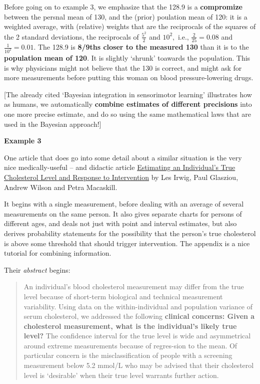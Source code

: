 \documentclass[]{book}
\begin{document}
Before going on to example 3, we emphasize that the 128.9 is a \textbf{compromize} between the persnal mean of 130, and the (prior) poulation mean of 120: it is a weighted average, with (relative) weights that are the reciprocals of the squares of the 2 standard deviations, the reciprocals of \(\frac{5^2}{2}\) and \(10^2,\) i.e., \(\frac{2}{25} = 0.08\) and \(\frac{1}{10^2} = 0.01.\) The
128.9 is \textbf{8/9ths closer to the measured 130} than it is to the \textbf{population mean of 120}. It is slightly `shrunk' toawards the population. This is why physicians might not believe that the 130 is correct, and might ask for more measurements before putting this woman on blood pressure-lowering drugs.

{[}The already cited `Bayesian integration in sensorimotor learning' illustrates how as humans, we automatically \textbf{combine estimates of different precisions} into one more precise estimate, and do so using the same mathematical laws that are used in the Bayesian approach!{]}

\textbf{Example 3}

One article that does go into some detail about a similar situation is the very nice medically-useful -- and didactic article \href{http://www.medicine.mcgill.ca/epidemiology/hanley/bios601/ch10Bayes/Irwig-1991-cholesterol.pdf}{Estimating an Individual's True Cholesterol Level and Response to Intervention} by Les Irwig, Paul Glasziou, Andrew Wilson and Petra Macaskill.

It begins with a single measurement, before dealing with an average of several measurements on the same person. It also gives separate charts for persons of different ages, and deals not just with point and interval estimates, but also derives probability statements for the possibility that the person's true cholesterol is above some threshold that should trigger intervention. The appendix is a nice tutorial for combining information.

Their \emph{abstract} begins:

\begin{quote}
An individual's blood cholesterol measurement may differ from the true level because of short-term biological and technical measurement variability. Using data on the within-individual and population variance of serum cholesterol, we addressed the following \textbf{clinical concerns: Given a cholesterol measurement, what is the individual's likely true level?} The confidence interval for the true level is wide and asymmetrical around extreme measurements because of regres-sion to the mean. Of particular concern is the misclassification of people with a screening measurement below 5.2 mmol/L who may be advised that their cholesterol level is `desirable' when their true level warrants further action.
\end{quote}
\end{document}
